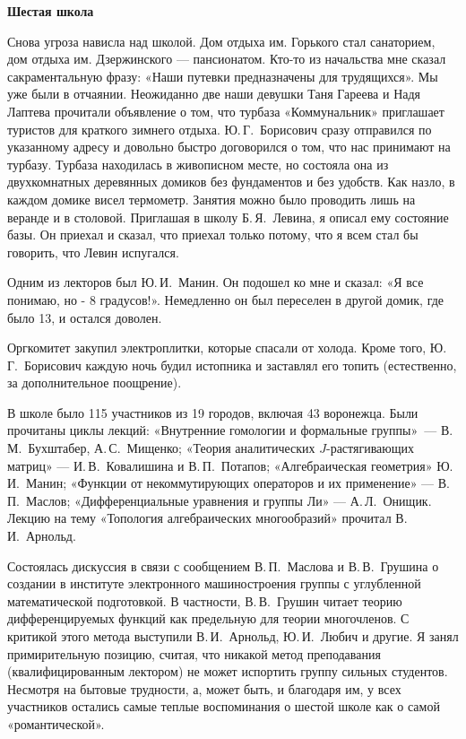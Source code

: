 {\bf Шестая школа}

Снова угроза нависла над школой. Дом отдыха им. Горького стал санаторием, дом отдыха им. Дзержинского --- пансионатом. Кто-то из начальства мне сказал сакраментальную фразу: «Наши путевки предназначены для трудящихся». Мы уже были в отчаянии. Неожиданно две наши девушки Таня Гареева и Надя Лаптева прочитали объявление о том, что турбаза «Коммунальник» приглашает туристов для краткого зимнего отдыха. Ю.\,Г.~Борисович сразу отправился по указанному адресу и довольно быстро договорился о том, что нас принимают на турбазу. Турбаза находилась в живописном месте, но состояла она из двухкомнатных деревянных домиков без фундаментов и без удобств. Как назло, в каждом домике висел термометр. Занятия можно было проводить лишь на веранде и в столовой. Приглашая в школу Б.\,Я.~Левина, я описал ему состояние базы. Он приехал и сказал, что приехал только потому, что я всем стал бы говорить, что Левин испугался.

Одним из лекторов был Ю.\,И.~Манин. Он подошел ко мне и сказал: «Я все понимаю, но - 8 градусов!». Немедленно он был переселен в другой домик, где было 13, и остался доволен.

Оргкомитет закупил электроплитки, которые спасали от холода. Кроме того, Ю.\,Г.~Борисович каждую ночь будил истопника и заставлял его топить (естественно, за дополнительное поощрение).

В школе было 115 участников из 19 городов, включая 43 воронежца.
Были прочитаны циклы лекций: «Внутренние гомологии и формальные группы»~--- В.\,М.~Бухштабер, А.\,С.~Мищенко;
«Теория аналитических $J$-растягивающих матриц» --- И.\,В.~Ковалишина и В.\,П.~Потапов;
«Алгебраическая геометрия» Ю.\,И.~Манин; «Функции от некоммутирующих операторов и их применение» --- В.\,П.~Маслов; «Дифференциальные уравнения и группы Ли» --- А.\,Л.~Онищик. Лекцию на тему «Топология алгебраических многообразий» прочитал В.\,И.~Арнольд.

Состоялась дискуссия в связи с сообщением В.\,П.~Маслова и В.\,В.~Грушина
о создании в институте электронного машиностроения группы с углубленной математической подготовкой.
В частности, В.\,В.~Грушин читает теорию дифференцируемых функций как предельную для теории многочленов. С критикой этого метода выступили В.\,И.~Арнольд, Ю.\,И.~Любич и другие. Я занял примирительную позицию, считая, что никакой метод преподавания (квалифицированным лектором) не может испортить группу сильных студентов.
Несмотря на бытовые трудности, а, может быть, и благодаря им, у всех участников остались самые теплые воспоминания о шестой школе как о самой «романтической».


